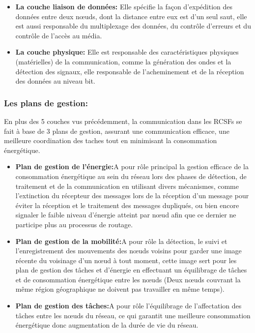 \begin{itemize}
  \item \textbf{La couche liaison de données:} Elle spécifie la façon d'expédition des données entre deux nœuds, dont la distance entre eux est d'un seul saut, elle est aussi responsable du multiplexage des données, du contrôle d'erreurs et du contrôle de l'accès au média.   \\
  
  \item \textbf{La couche physique:}  Elle est responsable des caractéristiques physiques (matérielles) de la communication, comme la génération des ondes et la détection des signaux, elle responsable de l'acheminement et de la réception des données au niveau bit.   \\ 
\end{itemize}


\subsubsection{Les plans de gestion:}
En plus des 5 couches vus précédemment, la communication dans les RCSFs se fait à base de 3 plans de gestion, assurant une communication efficace, une meilleure coordination des taches tout en minimisant la consommation énergétique.

\begin{itemize}
 \item \textbf{Plan de gestion de l'énergie:}A pour rôle principal la gestion efficace de la consommation énergétique au sein du réseau lors des phases de détection, de traitement et de la communication en utilisant divers mécanismes, comme l'extinction du récepteur des messages lors de la réception d'un message pour éviter la réception et le traitement des messages dupliqués, ou bien encore signaler le faible niveau d'énergie atteint par nœud afin que ce dernier ne participe plus au processus de routage.\\
 
 \item \textbf{Plan de gestion de la mobilité:}A pour rôle la détection, le suivi et l'enregistrement des mouvements des nœuds voisins  pour garder une image récente du voisinage d'un nœud à tout moment, cette image sert pour les plan de gestion des tâches et d'énergie en effectuant un équilibrage de tâches et de consommation énergétique entre les nœuds (Deux nœuds couvrant la même région géographique ne doivent pas travailler en même temps).  \\
 
 \item \textbf{Plan de gestion des tâches:}A pour rôle l'équilibrage de l'affectation des tâches entre les nœuds du réseau, ce qui garantit une meilleure consommation énergétique donc augmentation de la durée de vie du réseau.

\end{itemize}	
   
 
